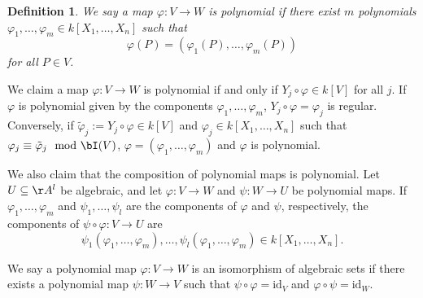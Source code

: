 \documentclass[12pt]{amsart}
\theoremstyle{plain}
\newtheorem{definition}[theorem]{Definition}
\begin{document}
\begin{definition}
We say a map $\varphi : V \to W$ is polynomial if there exist $m$ polynomials $\varphi_1, \ldots, \varphi_m \in k[X_1, \ldots, X_n]$ such that
$$\varphi(P) = (\varphi_1(P), \ldots, \varphi_m(P))$$
for all $P \in V$.
\end{definition}

We claim a map $\varphi: V \to W$ is polynomial if and only if $Y_j \circ \varphi \in k[V]$ for all $j$.
If $\varphi$ is polynomial given by the components $\varphi_1, \ldots, \varphi_m$, $Y_j \circ \varphi = \varphi_j$ is regular.
Conversely, if $\tilde \varphi_j := Y_j \circ \varphi \in k[V]$ and $\varphi_j \in k[X_1, \ldots, X_n]$ such that $\varphi_j \equiv \tilde \varphi_j \mod \bI(V)$, $\varphi = (\varphi_1, \ldots, \varphi_m)$ and $\varphi$ is polynomial.

We also claim that the composition of polynomial maps is polynomial.
Let $U \subseteq \AA^l$ be algebraic, and let $\varphi: V \to W$ and $\psi : W \to U$ be polynomial maps.
If $\varphi_1, \ldots, \varphi_m$ and $\psi_1, \ldots, \psi_l$ are the components of $\varphi$ and $\psi$, respectively, the components of $\psi \circ \varphi : V \to U$ are
$$\psi_1(\varphi_1, \ldots, \varphi_m), \ldots, \psi_l(\varphi_1, \ldots, \varphi_m) \in k[X_1, \ldots, X_n].$$

We say a polynomial map $\varphi : V \to W$ is an isomorphism of algebraic sets if there exists a polynomial map $\psi: W \to V$ such that $\psi \circ \varphi = \mathrm{id}_V$ and $\varphi \circ \psi = \mathrm{id}_W$.
\end{document}
